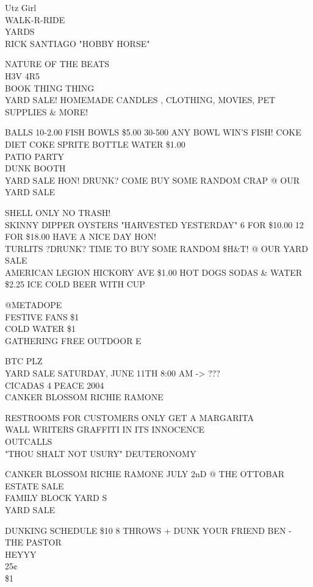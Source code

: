 \documentclass[10pt,letterpaper]{article}
\begin{document}
Utz Girl\\
WALK{-}R{-}RIDE\\
YARDS\\
RICK SANTIAGO "HOBBY HORSE"

NATURE OF THE BEATS\\
H3V 4R5\\
BOOK THING THING\\
YARD SALE! HOMEMADE CANDLES , CLOTHING, MOVIES, PET SUPPLIES \& MORE!

BALLS 10{-}2.00 FISH BOWLS \$5.00 30{-}500 ANY BOWL WIN'S FISH!  COKE DIET COKE SPRITE BOTTLE WATER \$1.00\\
PATIO PARTY\\
DUNK BOOTH\\
YARD SALE HON!  DRUNK?  COME BUY SOME RANDOM CRAP @ OUR YARD SALE

SHELL ONLY NO TRASH!\\
SKINNY DIPPER OYSTERS "HARVESTED YESTERDAY" 6 FOR \$10.00 12 FOR \$18.00 HAVE A NICE DAY HON!\\
TURLITS ?DRUNK? TIME TO BUY SOME RANDOM \$H\&T! @ OUR YARD SALE\\
AMERICAN LEGION HICKORY AVE \$1.00 HOT DOGS SODAS \& WATER \$2.25 ICE COLD BEER WITH CUP

@METADOPE\\
FESTIVE FANS \$1\\
COLD WATER \$1\\
GATHERING FREE OUTDOOR E

BTC PLZ\\
YARD SALE SATURDAY, JUNE 11TH 8:00 AM {-}> ???\\
CICADAS 4 PEACE 2004\\
CANKER BLOSSOM RICHIE RAMONE

RESTROOMS FOR CUSTOMERS ONLY GET A MARGARITA\\
WALL WRITERS GRAFFITI IN ITS INNOCENCE\\
OUTCALLS\\
"THOU SHALT NOT USURY" DEUTERONOMY

CANKER BLOSSOM RICHIE RAMONE JULY 2nD @ THE OTTOBAR\\
ESTATE SALE\\
FAMILY BLOCK YARD S\\
YARD SALE

DUNKING SCHEDULE \$10 8 THROWS + DUNK YOUR FRIEND BEN {-} THE PASTOR\\
HEYYY\\
25¢\\
\$1
\end{document}
